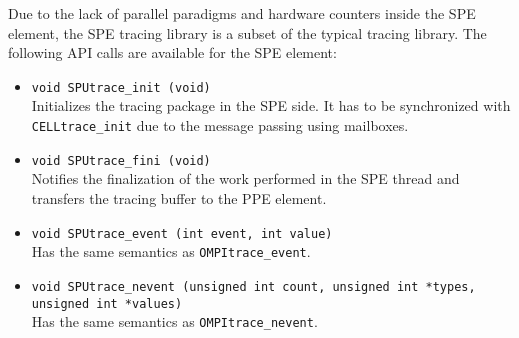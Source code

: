 Due to the lack of parallel paradigms and hardware counters inside the SPE element, the SPE tracing library is a subset of the typical tracing library. The following API calls are available for the SPE element:

\begin{itemize}

 \item {\tt void SPUtrace\_init (void)}\\
 Initializes the tracing package in the SPE side. It has to be synchronized with {\tt CELLtrace\_init} due to the message passing using mailboxes.

 \item {\tt void SPUtrace\_fini (void)}\\
 Notifies the finalization of the work performed in the SPE thread and transfers the tracing buffer to the PPE element.

 \item {\tt void SPUtrace\_event (int event, int value)}\\
 Has the same semantics as {\tt OMPItrace\_event}.

 \item {\tt void SPUtrace\_nevent (unsigned int count, unsigned int *types, unsigned int *values)}\\
 Has the same semantics as {\tt OMPItrace\_nevent}.

\end{itemize}

